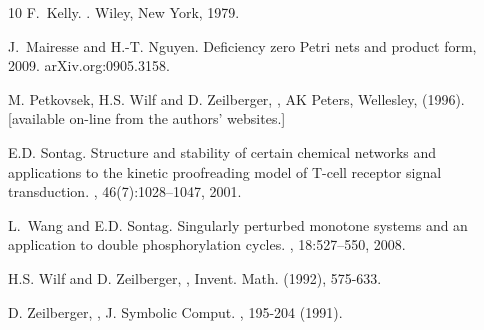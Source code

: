 \documentclass[11pt]{article}
\begin{document}
\begin{thebibliography}{10}
F.~Kelly.
\newblock {}.
\newblock Wiley, New York, 1979.

J.~Mairesse and H.-T. Nguyen.
\newblock Deficiency zero Petri nets and product form, 2009.
\newblock arXiv.org:0905.3158.

M. Petkovsek, H.S. Wilf and D. Zeilberger,
, AK Peters, Wellesley, (1996).
[available on-line from the authors' websites.]

E.D. Sontag.
\newblock Structure and stability of certain chemical networks and applications
  to the kinetic proofreading model of {T}-cell receptor signal transduction.
\newblock {}, 46(7):1028--1047, 2001.

L.~Wang and E.D. Sontag.
\newblock Singularly perturbed monotone systems and an application to double
  phosphorylation cycles.
\newblock {}, 18:527--550, 2008.

H.S. Wilf and D. Zeilberger,
, Invent. Math. 
 (1992), 575-633.

D. Zeilberger,
, J. Symbolic Comput.
, 195-204 (1991).

\end{thebibliography}
\end{document}
